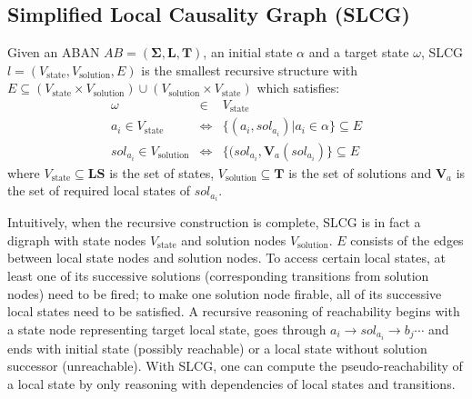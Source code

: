 \documentclass[runningheads]{llncs}
\begin{document}
\subsection{Simplified Local Causality Graph (SLCG)}
\begin{definition}[SLCG]\label{defSLCG}
Given an ABAN $AB =(\mathbf{\Sigma},\mathbf{L},\mathbf{T})$, an initial state $\alpha$ and a target state $\omega$, SLCG $l=(V_{\mathrm{state}},V_{\mathrm{solution}},E)$ is the smallest recursive structure with $E \subseteq(V_{\mathrm{state}}\times V_{\mathrm{solution}})\cup(V_{\mathrm{solution}}\times V_{\mathrm{state}})$ which satisfies:
\begin{eqnarray*}
    \omega&\in& V_{\mathrm{state}} \\
    a_i\in V_{\mathrm{state}} &\Leftrightarrow& \{(a_i, sol_{a_i})| a_i\in \alpha\}\subseteq E \\
    sol_{a_i}\in V_{\mathrm{solution}}&\Leftrightarrow& \{(sol_{a_i},\mathbf{V}_a(sol_{a_i})\}\subseteq E
\end{eqnarray*}
where $V_{\mathrm{state}}\subseteq\mathbf{LS}$ is the set of states, $V_{\mathrm{solution}}\subseteq \mathbf{T}$ is the set of solutions and $\mathbf{V}_a$ is the set of required local states of $sol_{a_i}$.
\end{definition}
Intuitively, when the recursive construction is complete, SLCG is in fact a digraph with state nodes $V_{\mathrm{state}}$ and solution nodes $V_{\mathrm{solution}}$. 
$E$ consists of the edges between local state nodes and solution nodes. 
To access certain local states, at least one of its successive solutions (corresponding transitions from solution nodes) need to be fired; to make one solution node firable, all of its successive local states need to be satisfied. 
A recursive reasoning of reachability begins with a state node representing target local state, goes through $a_i\to sol_{a_i}\to b_j \cdots$ and ends with initial state (possibly reachable) or a local state without solution successor (unreachable). 
With SLCG, one can compute the pseudo-reachability of a local state by only reasoning with dependencies of local states and transitions.
\end{document}
